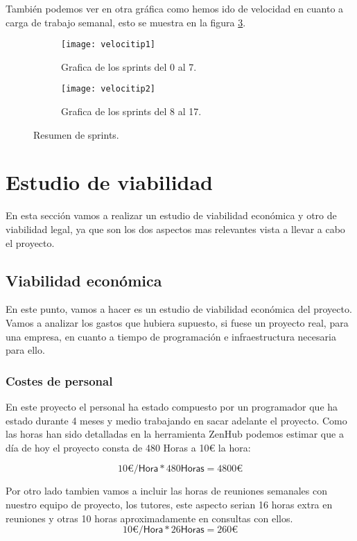 También podemos ver en otra gráfica como hemos ido de velocidad en cuanto a carga de trabajo semanal, esto se muestra en la figura \ref{fig:Resumen}.

\begin{figure}
	\begin{subfigure}[c]{.5\linewidth}
	\centering\large \texttt{[image: velocitip1]}
	\caption{Grafica de los sprints del 0 al 7.}\label{fig:orip1}
	\end{subfigure}%
	\begin{subfigure}[c]{.5\linewidth}
	\centering\large \texttt{[image: velocitip2]}
	\caption{Grafica de los sprints del 8 al 17.}\label{fig:calcp1}
	\end{subfigure}%
	\caption{Resumen de sprints.}
	\label{fig:Resumen}
\end{figure}



\section{Estudio de viabilidad}
En esta sección vamos a realizar un estudio de viabilidad económica y otro de viabilidad legal, ya que son los dos aspectos mas relevantes vista a llevar a cabo el proyecto.
\subsection{Viabilidad económica}
En este punto, vamos a hacer es un estudio de viabilidad económica del proyecto. Vamos a analizar los gastos que hubiera supuesto, si fuese un proyecto real, para una empresa, en cuanto a tiempo de programación e infraestructura necesaria para ello.
\subsubsection{Costes de personal}
En este proyecto el personal ha estado compuesto por un programador que ha estado durante 4 meses y medio trabajando en sacar adelante el proyecto.
Como las horas han sido detalladas en la herramienta ZenHub podemos estimar que a día de hoy el proyecto consta de 480 Horas a 10\euro{} la hora:

\[10{\euro{}} /\textsf{Hora}*480\textsf{Horas}=4800{\euro{}} \]

Por otro lado tambien vamos a incluir las horas de reuniones semanales con nuestro equipo de proyecto, los tutores, este aspecto serian 16 horas extra en reuniones y otras 10 horas aproximadamente en consultas con ellos.
\[10{\euro{}} /\textsf{Hora}*26\textsf{Horas}=260{\euro{}} \]

